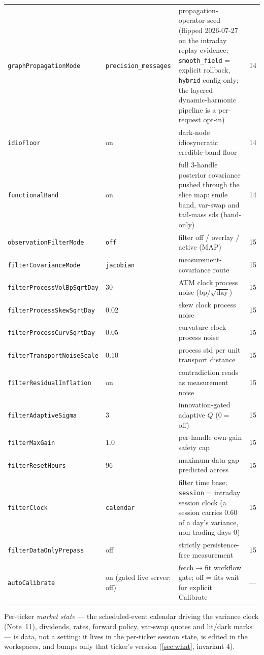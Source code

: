 \documentclass[11pt]{article}
\begin{document}
\begin{longtable}{p{}p{}p{}r}
\texttt{graphPropagationMode} & \texttt{precision\_\allowbreak messages} &
propagation-operator seed (flipped 2026-07-27 on the intraday replay
evidence; \texttt{smooth\_field} = explicit rollback, \texttt{hybrid}
config-only; the layered dynamic-harmonic pipeline is a per-request
opt-in) & 14\\
\texttt{idioFloor} & on & dark-node idiosyncratic credible-band floor & 14\\
\texttt{functionalBand} & on & full 3-handle posterior covariance pushed
through the slice map: smile band, var-swap and tail-mass sds (band-only) & 14\\
\texttt{observationFilterMode} & \texttt{off} & filter off / overlay / active (MAP) & 15\\
\texttt{filterCovarianceMode} & \texttt{jacobian} & measurement-covariance route & 15\\
\texttt{filterProcessVolBpSqrtDay} & $30$ & ATM clock process noise (bp/$\sqrt{\text{day}}$) & 15\\
\texttt{filterProcessSkewSqrtDay} & $0.02$ & skew clock process noise & 15\\
\texttt{filterProcessCurvSqrtDay} & $0.05$ & curvature clock process noise & 15\\
\texttt{filterTransportNoiseScale} & $0.10$ & process std per unit transport distance & 15\\
\texttt{filterResidualInflation} & on & contradiction reads as measurement noise & 15\\
\texttt{filterAdaptiveSigma} & $3$ & innovation-gated adaptive $Q$ ($0=$ off) & 15\\
\texttt{filterMaxGain} & $1.0$ & per-handle own-gain safety cap & 15\\
\texttt{filterResetHours} & $96$ & maximum data gap predicted across & 15\\
\texttt{filterClock} & \texttt{calendar} & filter time base;
\texttt{session} = intraday session clock (a session carries $0.60$ of a
day's variance, non-trading days $0$) & 15\\
\texttt{filterDataOnlyPrepass} & off & strictly persistence-free measurement & 15\\
\texttt{autoCalibrate} & on (gated live server: off) & fetch$\to$fit workflow
gate; off = fits wait for explicit Calibrate & ---\\
\bottomrule
\end{longtable}

Per-ticker \emph{market state} --- the scheduled-event calendar driving the
variance clock (Note~11), dividends, rates, forward policy, var-swap quotes and
lit/dark marks --- is data, not a setting: it lives in the per-ticker session
state, is edited in the workspaces, and bumps only that ticker's version
(\cref{sec:what}, invariant 4).
\end{document}
